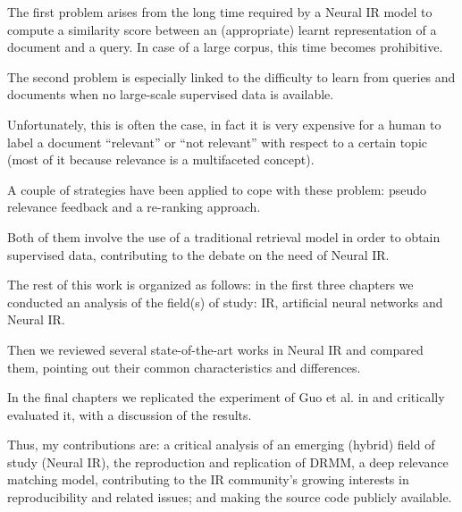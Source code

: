 The first problem arises from the long time required by a Neural IR model to compute a similarity score between an (appropriate) learnt representation of a document and a query. In case of a large corpus, this time becomes prohibitive.

The second problem is especially linked to the difficulty to learn from queries and documents when no large-scale supervised data is available.

Unfortunately, this is often the case, in fact it is very expensive for a human to label a document ``relevant'' or ``not relevant'' with respect to a certain topic (most of it because relevance is a multifaceted concept).

A couple of strategies have been applied to cope with these problem: pseudo relevance feedback and a re-ranking approach.

Both of them involve the use of a traditional retrieval model in order to obtain supervised data, contributing to the debate on the need of Neural IR.

The rest of this work is organized as follows: in the first three chapters we conducted an analysis of the field(s) of study: IR, artificial neural networks and Neural IR.

Then we reviewed several state-of-the-art works in Neural IR and compared them, pointing out their common characteristics and differences.

In the final chapters we replicated the experiment of Guo et al. in \cite{drmm} and critically evaluated it, with a discussion of the results.

Thus, my contributions are: a critical analysis of an emerging (hybrid) field of study (Neural IR), the reproduction and replication of DRMM, a deep relevance matching model, contributing to the IR community's growing interests in reproducibility and related issues; and making the source code publicly available.

